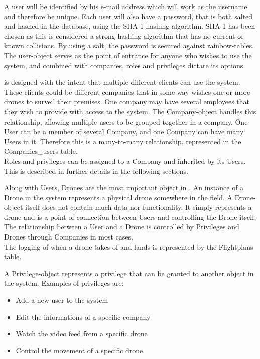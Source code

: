 A user will be identified by his e-mail address which will work as the username and therefore be unique.
Each user will also have a password, that is both salted and hashed in the database, using the SHA-1 hashing algorithm. SHA-1 has been chosen as this is considered a strong hashing algorithm that has no current or known collisions. By using a salt, the password is secured against rainbow-tables.\\

The user-object serves as the point of entrance for anyone who wishes to use the system, and combined with companies, roles and privileges dictate its options.


\projectname{} is designed with the intent that multiple different clients can use the system.
These clients could be different companies that in some way wishes one or more drones to surveil their premises.
One company may have several employees that they wish to provide with access to the system.
The Company-object handles this relationship, allowing multiple users to be grouped together in a company.
One User can be a member of several Company, and one Company can have many Users in it.
Therefore this is a many-to-many relationship, represented in the Companies\_users table. \\

Roles and privileges can be assigned to a Company and inherited by its Users.
This is described in further details in the following sections.


Along with Users, Drones are the most important object in \projectname{}.
An instance of a Drone in the system represents a physical drone somewhere in the field.
A Drone-object itself does not contain much data nor functionality.
It simply represents a drone and is a point of connection between Users and controlling the Drone itself. \\

The relationship between a User and a Drone is controlled by Privileges and Drones through Companies in most cases. \\

The logging of when a drone takes of and lands is represented by the Flightplans table.

\label{sec:privileges}
A Privilege-object represents a privilege that can be granted to another object in the system.
Examples of privileges are:

\begin{itemize}
    \item Add a new user to the system
    \item Edit the informations of a specific company
    \item Watch the video feed from a specific drone
    \item Control the movement of a specific drone
\end{itemize}

